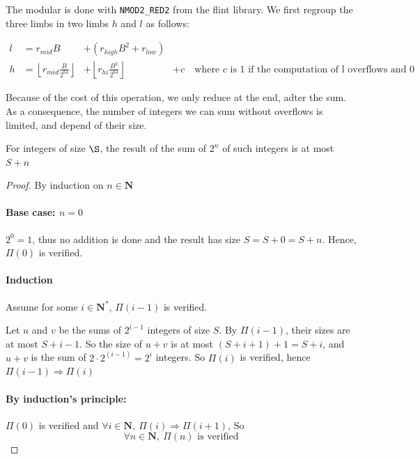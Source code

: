 \documentclass[a4paper]{article}
\begin{document}
The modular is done with \texttt{NMOD2\_RED2} from the flint library. We first regroup the three limbs in two limbs $h$ and $l$ as follows:

\begin{align}
    l &= r_{mid}B &+ \left(r_{high}B^2 + r_{low}\right) \\
    h &= \left\lfloor r_{mid}\frac{B}{2^{64}}\right\rfloor &+ \left\lfloor r_{hi}\frac{B^2}{2^{64}}\right\rfloor &+ c \quad{\text{where $c$ is $1$ if the computation of l overflows and 0 otherwise}}
\end{align}

Because of the cost of this operation, we only reduce at the end, adter the sum. As a consequence, the number of integers we can sum without overflows is limited, and depend of their size.

\begin{proposition}\label{prop:sum}
    For integers of size $\S$, the result of the sum of $2^n$ of such integers is at most $S + n$
\end{proposition}

\begin{proof}
    By induction on $n\in\mathbf{N}$

    \paragraph{Base case: $n = 0$}
    $2^0 = 1$, thus no addition is done and the result has size $S = S + 0 = S + n$. Hence, $\Pi(0)$ is verified.

    \paragraph{Induction}
    Assume for some $i \in \mathbf{N}^*$, $\Pi(i - 1)$ is verified.

    Let $u$ and $v$ be the sums of $2^{i-1}$ integers of size $ S $. By $\Pi(i-1)$, their sizes are at most $S + i - 1$. So the size of $u + v$ is at most $\left(S + i + 1\right) + 1 = S + i$, and $u + v$ is the sum of $2 \cdot 2^(i-1) = 2^i$ integers.
    So $\Pi(i)$ is verified, hence $\Pi(i-1) \Rightarrow \Pi(i)$

    \paragraph{By induction's principle:} $\Pi(0)$ is verified and $\forall i\in\mathbf{N},\ \Pi(i) \Rightarrow \Pi(i+1)$, So
    \begin{displaymath}
        \forall n\in\mathbf{N},\ \Pi(n)\text{ is verified}
    \end{displaymath}
\end{proof}
\end{document}
